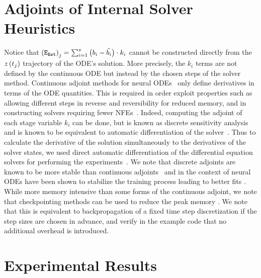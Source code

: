 \section{Adjoints of Internal Solver Heuristics}
\label{sec:adjoints_of_internal_solver_heuristics}

Notice that $\left(\texttt{E}_{\texttt{Est}}\right)_j = \sum_{i = 1}^s \left(b_i - \tilde{b_i}\right) \cdot k_i$ cannot be constructed directly from the $z\left(t_j\right)$ trajectory of the ODE's solution. More precisely, the $k_i$ terms are not defined by the continuous ODE but instead by the chosen steps of the solver method. Continuous adjoint methods for neural ODEs~\citep{chen2018neural, zhuang2021mali} only define derivatives in terms of the ODE quantities. This is required in order exploit properties such as allowing different steps in reverse and reversibility for reduced memory, and in constructing solvers requiring fewer NFEs~\citep{kidger2020hey}. Indeed, computing the adjoint of each stage variable $k_i$ can be done, but is known as discrete sensitivity analysis and is known to be equivalent to automatic differentiation of the solver~\citep{zhang2014fatode}. Thus to calculate the derivative of the solution simultaneously to the derivatives of the solver states, we used direct automatic differentiation of the differential equation solvers for performing the experiments~\citep{innes2018don}. We note that discrete adjoints are known to be more stable than continuous adjoints~\citep{zhang2014fatode} and in the context of neural ODEs have been shown to stabilize the training process leading to better fits \citep{gholami2019anode,onken2020discretize}. While more memory intensive than some forms of the continuous adjoint, we note that checkpointing methods can be used to reduce the peak memory \citep{dauvergne2006data}. We note that this is equivalent to backpropagation of a fixed time step discretization if the step sizes are chosen in advance, and verify in the example code that no additional overhead is introduced.


\section{Experimental Results}
\label{sec:experimental_results_global_regularized_neural_des}


